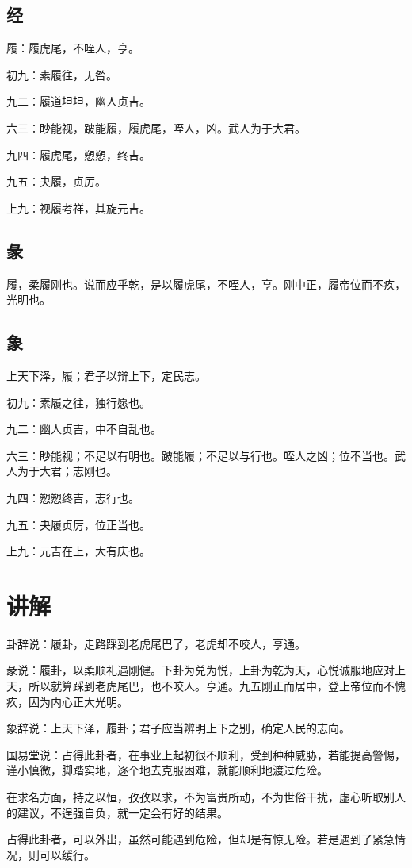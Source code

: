 \documentclass[12pt,oneside]{book}
\begin{document}
\subsection{经}
履：履虎尾，不咥人，亨。

初九：素履往，无咎。

九二：履道坦坦，幽人贞吉。

六三：眇能视，跛能履，履虎尾，咥人，凶。武人为于大君。

九四：履虎尾，愬愬，终吉。

九五：夬履，贞厉。

上九：视履考祥，其旋元吉。

\subsection{彖}
履，柔履刚也。说而应乎乾，是以履虎尾，不咥人，亨。刚中正，履帝位而不疚，光明也。

\subsection{象}
上天下泽，履；君子以辩上下，定民志。

初九：素履之往，独行愿也。

九二：幽人贞吉，中不自乱也。

六三：眇能视；不足以有明也。跛能履；不足以与行也。咥人之凶；位不当也。武人为于大君；志刚也。

九四：愬愬终吉，志行也。

九五：夬履贞厉，位正当也。

上九：元吉在上，大有庆也。

\section{讲解}
卦辞说：履卦，走路踩到老虎尾巴了，老虎却不咬人，亨通。

彖说：履卦，以柔顺礼遇刚健。下卦为兑为悦，上卦为乾为天，心悦诚服地应对上天，所以就算踩到老虎尾巴，也不咬人。亨通。九五刚正而居中，登上帝位而不愧疚，因为内心正大光明。

象辞说：上天下泽，履卦；君子应当辨明上下之别，确定人民的志向。

国易堂说：占得此卦者，在事业上起初很不顺利，受到种种威胁，若能提高警惕，谨小慎微，脚踏实地，逐个地去克服困难，就能顺利地渡过危险。

在求名方面，持之以恒，孜孜以求，不为富贵所动，不为世俗干扰，虚心听取别人的建议，不逞强自负，就一定会有好的结果。

占得此卦者，可以外出，虽然可能遇到危险，但却是有惊无险。若是遇到了紧急情况，则可以缓行。
\end{document}
